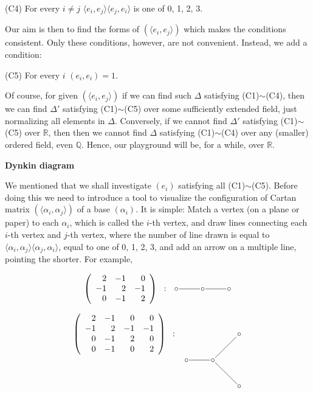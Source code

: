 \documentclass{article}
\newcommand{\RaQ}{\mathbb{Q}}
\newcommand{\ReR}{\mathbb{R}}
\begin{document}
(C4) For every $i \ne j$ $\langle e_i, e_j \rangle \langle e_j, e_i \rangle$ is one of 0, 1, 2, 3.

Our aim is then to find the forms of $(\langle e_i, e_j \rangle)$ which makes the conditions consistent.
Only these conditions, however, are not convenient.
Instead, we add a condition:

(C5) For every $i$ $(e_i, e_i) = 1$.

Of course, for given $(\langle e_i, e_j \rangle)$ if we can find such $\Delta$ satisfying (C1)$\sim$(C4), then we can find $\Delta'$ satisfying (C1)$\sim$(C5) over some sufficiently extended field, just normalizing all elements in $\Delta$.
Conversely, if we cannot find $\Delta'$ satisfying (C1)$\sim$(C5) over $\ReR$, then then we cannot find $\Delta$ satisfying (C1)$\sim$(C4) over any (smaller) ordered field, even $\RaQ$.
Hence, our playground will be, for a while, over $\ReR$.

\newpage

\textbf{Dynkin diagram}

We mentioned that we shall investigate $(e_i)$ satisfying all (C1)$\sim$(C5).
Before doing this we need to introduce a tool to visualize the configuration of Cartan matrix $(\langle \alpha_i, \alpha_j \rangle)$ of a base $(\alpha_i)$.
It is simple: Match a vertex (on a plane or paper) to each $\alpha_i$, which is called the $i$-th vertex, and draw lines connecting each $i$-th vertex and $j$-th vertex, where the number of line drawn is equal to $\langle \alpha_i, \alpha_j \rangle \langle \alpha_j, \alpha_i \rangle$, equal to one of 0, 1, 2, 3, and add an arrow on a multiple line, pointing the shorter. For example, 

\begin{displaymath}
  \left( \begin{array}{rrr}
     2 & -1 &  0 \\
    -1 &  2 & -1 \\
     0 & -1 &  2
  \end{array} \right)
  \;\; : \;\; 
  \xymatrix@1{\circ \ar@{-}[r] & \circ \ar@{-}[r] & \circ}
\end{displaymath}

\begin{displaymath}
  \begin{array}{cc}
    \left( \begin{array}{rrrr}
       2 & -1 &  0 &  0 \\
      -1 &  2 & -1 & -1 \\
       0 & -1 &  2 &  0 \\
       0 & -1 &  0 &  2
    \end{array} \right)
    \;\; : &  
    \xymatrix@1{ & & \circ \\ \circ \ar@{-}[r] & \circ \ar@{-}[ur] \ar@{-}[dr] \\ & & \circ}
  \end{array}
\end{displaymath}
\end{document}
